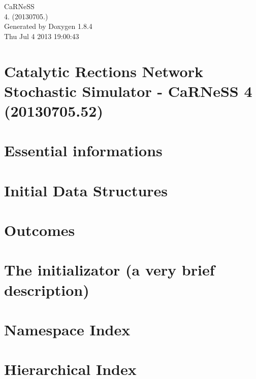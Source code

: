 \documentclass[twoside]{book}
\newcommand{\clearemptydoublepage}{%
  \newpage{\pagestyle{empty}\cleardoublepage}%
}
\begin{document}
\hypersetup{pageanchor=false}
\begin{titlepage}
\vspace*{7cm}
\begin{center}%
{\Large Ca\-R\-Ne\-S\-S \\[1ex]\large 4. (20130705.) }\\
\vspace*{1cm}
{\large Generated by Doxygen 1.8.4}\\
\vspace*{0.5cm}
{\small Thu Jul 4 2013 19:00:43}\\
\end{center}
\end{titlepage}
\clearemptydoublepage
\tableofcontents
\clearemptydoublepage
{}
\hypersetup{pageanchor=true}

\chapter{Catalytic Rections Network Stochastic Simulator -\/ Ca\-R\-Ne\-S\-S 4 (20130705.52)}
\label{index}\hypertarget{index}{}
\chapter{Essential informations}
\label{intro}
\hypertarget{intro}{}

\chapter{Initial Data Structures}
\label{pageInitStr}
\hypertarget{pageInitStr}{}

\chapter{Outcomes}
\label{pageoutcomes}
\hypertarget{pageoutcomes}{}

\chapter{The initializator (a very brief description)}
\label{pageInitializator}
\hypertarget{pageInitializator}{}

\chapter{Namespace Index}

\chapter{Hierarchical Index}

\end{document}
